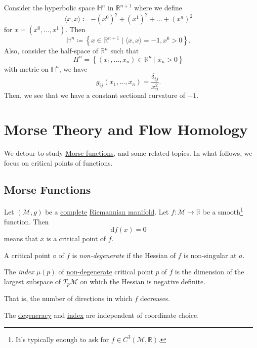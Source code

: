 Consider the hyperbolic space \(\mathbb{H} ^n\) in \(\mathbb{R} ^{n+1}\) where we define
\[
	\langle x, x \rangle \coloneqq -(x^0)^2 + (x^1)^2 + \dots + (x^n)^2
\]
for \(x=(x^0, \dots , x^1)\). Then
\[
	\mathbb{H} ^n \coloneqq \left\{ x\in \mathbb{R} ^{n+1} \mid \langle x, x \rangle = -1, x^0 > 0 \right\}.
\]
Also, consider the half-space of \(\mathbb{R} ^n\) such that
\[
	H^n = \left\{ (x_1, \dots , x_n)\in \mathbb{R} ^n \mid x_n > 0 \right\}
\]
with metric on \(\mathbb{H} ^n\), we have
\[
	g_{ij}(x_1, \dots , x_n) = \frac{\delta _{ij}}{x_n^2}.
\]
Then, we see that we have a constant sectional curvature of \(-1\).

\section{Morse Theory and Flow Homology}
We detour to study \hyperref[def:Morse-function]{Morse functions}, and some related topics. In what follows, we focus on critical points of functions.

\subsection{Morse Functions}
Let \((\mathcal{M} , g)\) be a \hyperref[def:geodesically-complete]{complete} \hyperref[def:Riemannian-manifold]{Riemannian manifold}. Let \(f\colon \mathcal{M} \to \mathbb{R} \) be a smooth\footnote{It's typically enough to ask for \(f\in C^3(\mathcal{M} , \mathbb{R} )\).} function. Then
\[
	\mathrm{d} f(x) = 0
\]
means that \(x\) is a critical point of \(f\).

\begin{definition}\label{def:non-degenerate}
	A critical point \(a\) of \(f\) is \emph{non-degenerate} if the Hessian of \(f\) is non-singular at \(a\).
\end{definition}

\begin{definition}\label{def:Morse-index}
	The \emph{index} \(\mu (p)\) of \hyperref[def:non-degenerate]{non-degenerate} critical point \(p\) of \(f\) is the dimension of the largest subspace of \(T_p \mathcal{M} \) on which the Hessian is negative definite.
\end{definition}

\begin{intuition}
	That is, the number of directions in which \(f\) decreases.
\end{intuition}

\begin{note}
	The \hyperref[def:non-degenerate]{degeneracy} and \hyperref[def:Morse-index]{index} are independent of coordinate choice.
\end{note}

